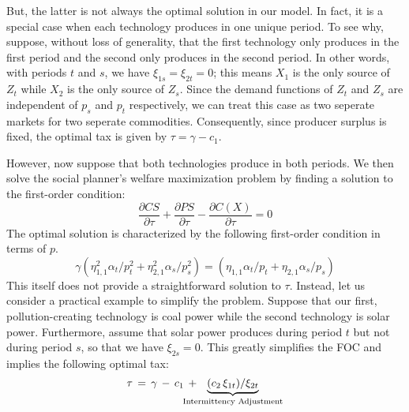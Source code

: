 \documentclass[12pt,a4paper]{extarticle}
\begin{document}
But, the latter is not always the optimal solution in our model. In fact, it is a special case when each technology produces in one unique period. To see why, suppose, without loss of generality, that the first technology only produces in the first period and the second only produces in the second period. In other words, with periods $t$ and $s$, we have $\xi_{1s} = \xi_{2t} = 0$; this means $X_1$ is the only source of $Z_t$ while $X_2$  is the only source of $Z_s$. Since the demand functions of $Z_t$ and $Z_s$ are independent of $p_s$ and $p_t$ respectively, we can treat this case as two seperate markets for two seperate commodities. Consequently, since producer surplus is fixed, the optimal tax is given by $\tau = \gamma - c_1$. 

However, now suppose that both technologies produce in both periods. We then solve the social planner's welfare maximization problem by finding a solution to the first-order condition:
$$\frac{\partial CS}{\partial \tau} + \frac{\partial PS}{\partial \tau} - \frac{\partial C(X)}{\partial \tau} = 0$$
The optimal solution is characterized by the following first-order condition in terms of $p$.
$$
\gamma \left( \eta_{1,1}^2 \alpha_t / p_t^2 + \eta_{2,1}^2 \alpha_s / p_s^2 \right) = \left(\eta_{1,1} \alpha_t /p_t + \eta_{2,1} \alpha_s / p_s \right) $$
This itself does not provide a straightforward solution to $\tau$. Instead, let us consider a practical example to simplify the problem. Suppose that our first, pollution-creating technology is coal power while the second technology is solar power. Furthermore, assume that solar power produces during period $t$ but not during period $s$, so that we have $\xi_{2s} = 0$. This greatly simplifies the FOC and implies the following optimal tax:
$$\tau \, = \,  \gamma \, - \, c_1 \, +  \hspace{-1.5em} \underbrace{(c_2 \, \xi_{1t})/ \xi_{2t}}_\textrm{Intermittency Adjustment}$$
\end{document}
